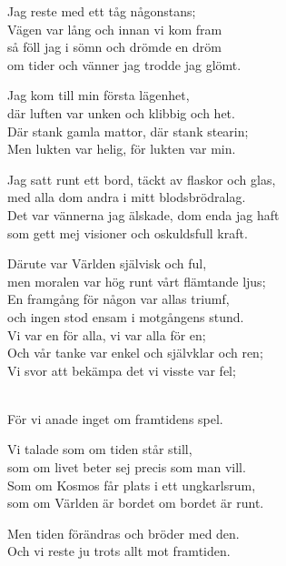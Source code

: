 \vspace{10pt}
Jag reste med ett tåg någonstans;\\
Vägen var lång och innan vi kom fram\\
så föll jag i sömn och drömde en dröm\\
om tider och vänner jag trodde jag glömt.\par
\vspace{10pt}
Jag kom till min första lägenhet,\\
där luften var unken och klibbig och het.\\
Där stank gamla mattor, där stank stearin;\\
Men lukten var helig, för lukten var min.\par
\vspace{10pt}
Jag satt runt ett bord, täckt av flaskor och glas,\\
med alla dom andra i mitt blodsbrödralag.\\
Det var vännerna jag älskade, dom enda jag haft\\
som gett mej visioner och oskuldsfull kraft.\par
\vspace{10pt}
Därute var Världen självisk och ful,\\
men moralen var hög runt vårt flämtande ljus;\\
En framgång för någon var allas triumf,\\
och ingen stod ensam i motgångens stund.\\
Vi var en för alla, vi var alla för en;\\
Och vår tanke var enkel och självklar och ren;\\
Vi svor att bekämpa det vi visste var fel;\par
\vspace{10pt}
\\
För vi anade inget om framtidens spel.\par
\vspace{10pt}
Vi talade som om tiden står still,\\
som om livet beter sej precis som man vill.\\
Som om Kosmos får plats i ett ungkarlsrum,\\
som om Världen är bordet om bordet är runt.\par
\vspace{10pt}
Men tiden förändras och bröder med den.\\
Och vi reste ju trots allt mot framtiden.\\
